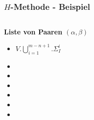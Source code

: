 \begin{frame}
\frametitle{$H$-Methode - Beispiel}
\begin{columns}[T] %

\begin{column}{.4\textwidth}
\textbf{Liste von Paaren $(\alpha,\beta)$}\\
  \begin{itemize}
	\item<1>$V.\bigcup\limits_{i=1}^{m-n+1}.\Sigma_I^i$
	\item<2-3>
    \item<4-5>
    \item<6-7>
    \item<8-9>
    \item<10-11>
    \item<12-13>
  \end{itemize}
\end{column}%


\end{columns}
\end{frame}
